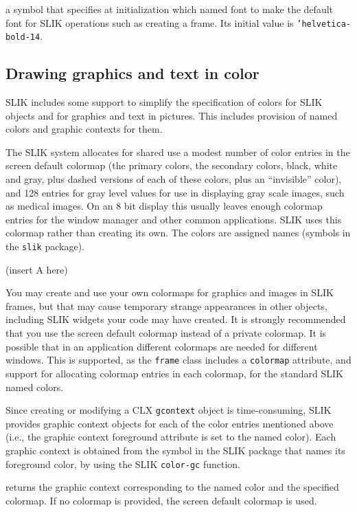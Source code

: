 \documentclass[twoside,openright,11pt]{report}
\newcommand{\tp}[1]{\texttt{#1}}
\begin{document}
{a symbol that specifies at initialization which named font to make
the default font for SLIK operations such as creating a frame.  Its
initial value is \tp{'helvetica-bold-14}.}

\subsection{Drawing graphics and text in color} \label{sec:color}

SLIK includes some support to simplify the specification of colors for
SLIK objects and for graphics and text in pictures.  This includes
provision of named colors and graphic contexts for them.

The SLIK system allocates for shared use a modest number of color
entries in the screen default colormap (the primary colors, the
secondary colors, black, white and gray, plus dashed versions of each
of these colors, plus an ``invisible'' color), and 128 entries for
gray level values for use in displaying gray scale images, such as
medical images.  On an 8 bit display this usually leaves enough
colormap entries for the window manager and other common applications.
SLIK uses this colormap rather than creating its own.  The colors are
assigned names (symbols in the \tp{slik} package).

(insert A here)

You may create and use your own colormaps for graphics and images in
SLIK frames, but that may cause temporary strange appearances in other
objects, including SLIK widgets your code may have created.  It is
strongly recommended that you use the screen default colormap instead
of a private colormap.  It is possible that in an application
different colormaps are needed for different windows.  This is
supported, as the \tp{frame} class includes a \tp{colormap} attribute,
and support for allocating colormap entries in each colormap, for the
standard SLIK named colors.

Since creating or modifying a CLX \tp{gcontext} object is
time-consuming, SLIK provides graphic context objects for each of the
color entries mentioned above (i.e., the graphic context foreground
attribute is set to the named color).  Each graphic context is
obtained from the symbol in the SLIK package that names its foreground
color, by using the SLIK \tp{color-gc} function.

{returns the graphic context corresponding to the named color and the
specified colormap.  If no colormap is provided, the screen default
colormap is used.}
\end{document}
